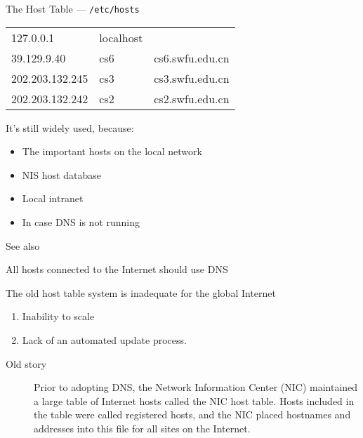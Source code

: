 \begin{frame}{The Host Table --- \texttt{/etc/hosts}}
  \begin{center}\ttfamily
    \begin{tabular}{lll}
      127.0.0.1       & localhost &                 \\
      39.129.9.40     & cs6       & cs6.swfu.edu.cn \\
      202.203.132.245 & cs3       & cs3.swfu.edu.cn \\
      202.203.132.242 & cs2       & cs2.swfu.edu.cn
    \end{tabular}
  \end{center}
  It's still widely used, because:
  \begin{itemize}
  \item The important hosts on the local network
  \item NIS host database
  \item Local intranet
  \item In case DNS is not running
  \end{itemize}
\end{frame}

See also 

\begin{frame}{All hosts connected to the Internet should use DNS}
  \begin{iblock}{The old host table system is inadequate for the global Internet}
    \begin{enumerate}
    \item[\Bad] Inability to scale
    \item[\Bad] Lack of an automated update process.
    \end{enumerate}

    \begin{description}
    \item[Old story] Prior to adopting DNS, the Network Information Center (NIC)
      maintained a large table of Internet hosts called the NIC host table. Hosts included
      in the table were called registered hosts, and the NIC placed hostnames and
      addresses into this file for all sites on the Internet.
    \end{description}    
  \end{iblock}
\end{frame}

